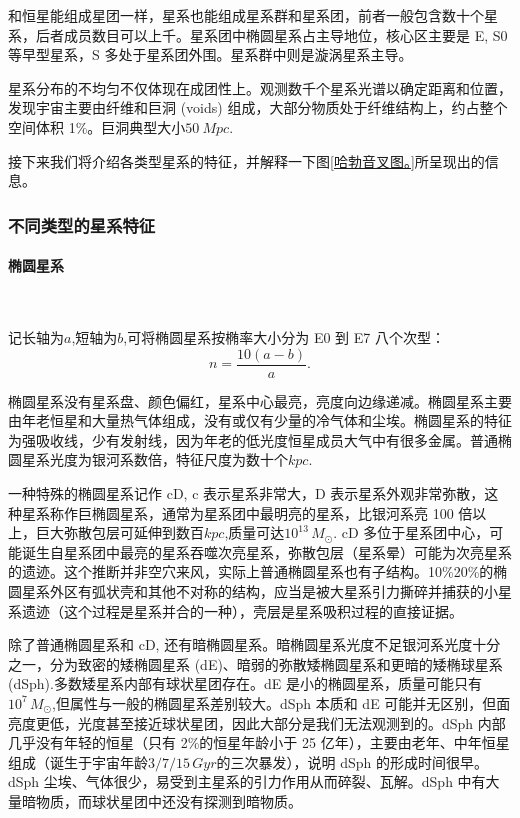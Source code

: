 \documentclass[../天体物理基础.tex]{subfiles}
\begin{document}
和恒星能组成星团一样，星系也能组成星系群和星系团，前者一般包含数十个星系，后者成员数目可以上千。星系团中椭圆星系占主导地位，核心区主要是 E, S0 等早型星系，S 多处于星系团外围。星系群中则是漩涡星系主导。

星系分布的不均匀不仅体现在成团性上。观测数千个星系光谱以确定距离和位置，发现宇宙主要由纤维和巨洞 (voids) 组成，大部分物质处于纤维结构上，约占整个空间体积 1\%。巨洞典型大小$\qty{50}{Mpc}$.

接下来我们将介绍各类型星系的特征，并解释一下图\ref{哈勃音叉图。}所呈现出的信息。

\subsubsection{不同类型的星系特征}

\paragraph{椭圆星系}~{}

记长轴为$a$,短轴为$b$,可将椭圆星系按椭率大小分为 E0 到 E7 八个次型：
\begin{equation}
n=\frac{10\left(a-b\right)}{a}.
\end{equation}

椭圆星系没有星系盘、颜色偏红，星系中心最亮，亮度向边缘递减。椭圆星系主要由年老恒星和大量热气体组成，没有或仅有少量的冷气体和尘埃。椭圆星系的特征为强吸收线，少有发射线，因为年老的低光度恒星成员大气中有很多金属。普通椭圆星系光度为银河系数倍，特征尺度为数十个$\unit{kpc}$.

一种特殊的椭圆星系记作 cD, c 表示星系非常大，D 表示星系外观非常弥散，这种星系称作巨椭圆星系，通常为星系团中最明亮的星系，比银河系亮 100 倍以上，巨大弥散包层可延伸到数百$\unit{kpc}$,质量可达$10^{13}\,\unit{M_{\odot}}$. cD 多位于星系团中心，可能诞生自星系团中最亮的星系吞噬次亮星系，弥散包层（星系晕）可能为次亮星系的遗迹。这个推断并非空穴来风，实际上普通椭圆星系也有子结构。10\%\text{\textendash}20\%的椭圆星系外区有弧状壳和其他不对称的结构，应当是被大星系引力撕碎并捕获的小星系遗迹（这个过程是星系并合的一种），壳层是星系吸积过程的直接证据。

除了普通椭圆星系和 cD, 还有暗椭圆星系。暗椭圆星系光度不足银河系光度十分之一，分为致密的矮椭圆星系 (dE)、暗弱的弥散矮椭圆星系和更暗的矮椭球星系 (dSph).多数矮星系内部有球状星团存在。dE 是小的椭圆星系，质量可能只有$10^{7}\,\unit{M_{\odot}}$,但属性与一般的椭圆星系差别较大。dSph 本质和 dE 可能并无区别，但面亮度更低，光度甚至接近球状星团，因此大部分是我们无法观测到的。dSph 内部几乎没有年轻的恒星（只有 2\%的恒星年龄小于 25 亿年），主要由老年、中年恒星组成（诞生于宇宙年龄$3/7/15\,\unit{Gyr}$的三次暴发），说明 dSph 的形成时间很早。dSph 尘埃、气体很少，易受到主星系的引力作用从而碎裂、瓦解。dSph 中有大量暗物质，而球状星团中还没有探测到暗物质。
\end{document}

